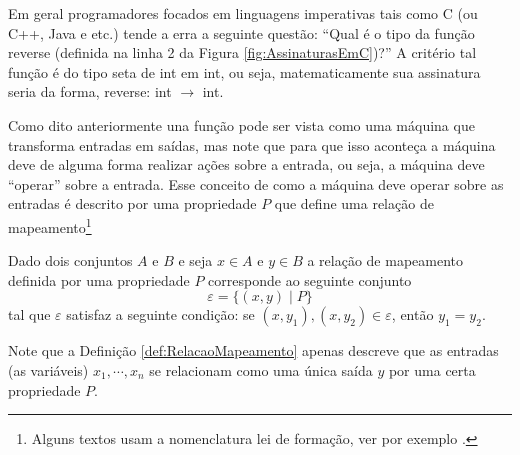 \begin{note}\label{note:TipoFuncao}
	Em geral programadores focados em linguagens imperativas tais como C (ou C++, Java e etc.) tende a erra a seguinte questão: ``Qual é o tipo da função reverse (definida na linha 2 da Figura \ref{fig:AssinaturasEmC})?'' A critério tal função é do tipo seta de int em int, ou seja, matematicamente sua assinatura seria da forma, reverse: int $\rightarrow$ int.
\end{note}

Como dito anteriormente una função pode ser vista como uma máquina que transforma entradas em saídas, mas note que para que isso aconteça a máquina deve de alguma forma realizar ações sobre a entrada, ou seja, a máquina deve ``operar'' sobre a entrada. Esse conceito de como a máquina deve operar sobre as entradas é descrito por uma propriedade $P$ que define uma relação de mapeamento\footnote{Alguns textos usam a nomenclatura lei de formação, ver por exemplo \cite{carmo2013}.}

\begin{definition}\label{def:RelacaoMapeamento}
	Dado dois conjuntos $A$ e $B$ e seja $x \in A$ e $y \in B$ a relação de mapeamento definida por uma propriedade $P$ corresponde  ao seguinte conjunto 
	$$\varepsilon = \{(x, y)\mid P\}$$ tal que $\varepsilon$ satisfaz a seguinte condição: se $(x, y_1), (x, y_2) \in \varepsilon$, então $y_1 = y_2$.
\end{definition}

Note que a Definição \ref{def:RelacaoMapeamento} apenas descreve que as entradas (as variáveis) $x_1, \cdots, x_n$ se relacionam como uma única saída $y$ por uma certa propriedade $P$.

